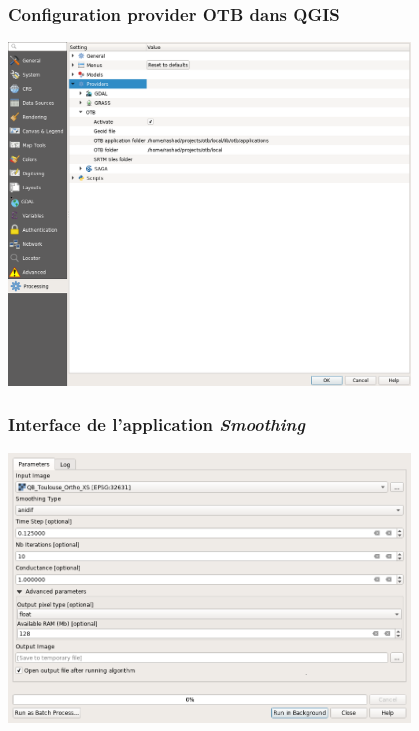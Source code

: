 \documentclass[8pt]{beamer}
\begin{document}
\begin{frame}
\frametitle{Configuration provider OTB dans QGIS}
\begin{center}
\includegraphics[width=0.8\textwidth]{images/qgis_otb_provider_config.png}
\end{center} 
\end{frame}

\begin{frame}
\frametitle{Interface de l'application \textit{Smoothing}}
\begin{center}
\includegraphics[width=0.8\textwidth]{images/qgis_smoothing.png}
\end{center} 
\end{frame}
\end{document}
